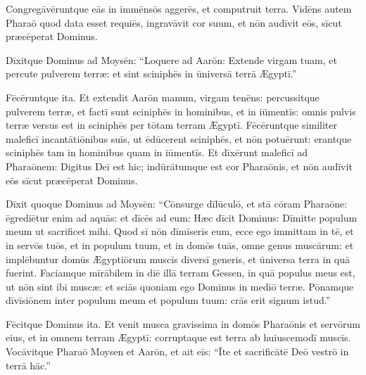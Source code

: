 Congregāvēruntque eās in immēnsōs
aggerēs, et computruit terra.  Vidēns autem
Pharaō quod data esset requiēs, ingravāvit cor suum, et nōn
audīvit eōs, sīcut præcēperat Dominus. 

Dīxitque Dominus ad Moysēn: ``Loquere ad Aarōn: Extende
virgam tuam, et percute pulverem terræ: et sint
sciniphēs in ūniversā terrā Ægyptī.''

Fēcēruntque ita. Et
extendit Aarōn manum, virgam tenēns: percussitque pulverem
terræ, et factī sunt sciniphēs in hominibus, et in
iūmentīs: omnis pulvis terræ versus est in
sciniphēs per tōtam terram Ægyptī.  Fēcēruntque
similiter maleficī
incantātiōnibus suīs, ut ēdūcerent
sciniphēs, et nōn potuērunt: erantque
sciniphēs tam in hominibus quam in
iūmentīs.  Et dīxērunt maleficī ad
Pharaōnem: Digitus Deī est hic; indūrātumque est cor Pharaōnis, et nōn audīvit eōs
sīcut præcēperat Dominus.  

Dīxit quoque
Dominus ad Moysēn: ``Cōnsurge
dīlūculō, et stā cōram Pharaōne:
ēgrediētur enim ad aquās: et dīcēs ad eum: Hæc dīcit Dominus: Dīmitte
populum meum ut sacrificet mihi.  Quod sī nōn dīmīserīs eum, ecce ego
immittam in tē, et in servōs tuōs,
et in populum tuum, et in domōs tuās, omne genus muscārum:
et implēbuntur domūs Ægyptiōrum muscīs
dīversī generis, et ūniversa terra in quā fuerint. 
Faciamque mīrābilem in diē illā terram Gessen, in quā populus meus est, ut
nōn sint ibi muscæ: et sciās quoniam ego Dominus in mediō
terræ.  Pōnamque dīvīsiōnem inter populum meum et populum
tuum: crās erit signum istud.''

Fēcitque Dominus ita. Et venit
musca gravissima in domōs Pharaōnis et
servōrum eius, et in omnem terram Ægyptī: corruptaque est
terra ab huiuscemodī muscīs.  Vocāvitque
Pharaō Moysen et Aarōn, et ait eīs: ``Īte et
sacrificātē Deō vestrō in terrā hāc.''  

